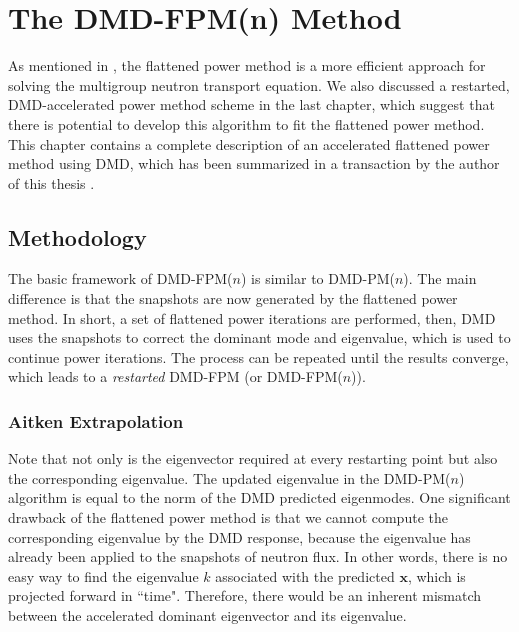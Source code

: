 \cleardoublepage

\chapter{The DMD-FPM(n) Method}
\label{chapter:DMD-FPM(n)}

As mentioned in , the flattened power method is a more efficient approach for solving the multigroup neutron transport equation.
We also discussed a restarted, DMD-accelerated power method scheme in the last chapter, which suggest that there is potential to develop this algorithm to fit the flattened power method.
This chapter contains a complete description of an accelerated flattened power method using DMD, which has been summarized in a transaction by the author of this thesis \cite{xu_acceleration}. 

\section{Methodology}
The basic framework of DMD-FPM($n$) is similar to DMD-PM($n$). The main difference is that the snapshots are now generated by the flattened power method.
In short, a set of flattened power iterations are performed, then, DMD uses the snapshots to correct the dominant mode and eigenvalue, which is used to continue power iterations.
The process can be repeated until the results converge, which leads to a {\it restarted} DMD-FPM (or DMD-FPM($n$)).

\subsection{Aitken Extrapolation}
Note that not only is the eigenvector required at every restarting point but also the corresponding eigenvalue.
The updated eigenvalue in the DMD-PM($n$) algorithm is equal to the norm of the DMD predicted eigenmodes. 
One significant drawback of the flattened power method is that we cannot compute the corresponding eigenvalue by the DMD response, because the eigenvalue has already been applied to the snapshots of neutron flux.
In other words, there is no easy way to find the eigenvalue $k$ associated with the predicted $\mathbf{x}$, which is projected forward in ``time".
Therefore, there would be an inherent mismatch between the accelerated dominant eigenvector and its eigenvalue.

